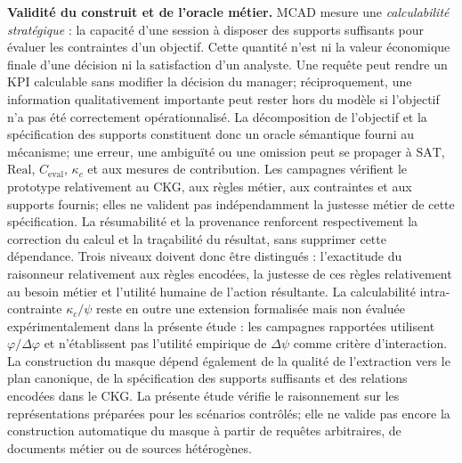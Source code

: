 \documentclass[journal]{IEEEtran}
\begin{document}
\textbf{Validité du construit et de l'oracle métier.} MCAD mesure une \emph{calculabilité stratégique} : la capacité d'une session à disposer des supports suffisants pour évaluer les contraintes d'un objectif. Cette quantité n'est ni la valeur économique finale d'une décision ni la satisfaction d'un analyste. Une requête peut rendre un KPI calculable sans modifier la décision du manager; réciproquement, une information qualitativement importante peut rester hors du modèle si l'objectif n'a pas été correctement opérationnalisé. La décomposition de l'objectif et la spécification des supports constituent donc un oracle sémantique fourni au mécanisme; une erreur, une ambiguïté ou une omission peut se propager à $\mathrm{SAT}$, $\mathrm{Real}$, $C_{\mathrm{eval}}$, $\kappa_c$ et aux mesures de contribution. Les campagnes vérifient le prototype relativement au CKG, aux règles métier, aux contraintes et aux supports fournis; elles ne valident pas indépendamment la justesse métier de cette spécification. La résumabilité et la provenance renforcent respectivement la correction du calcul et la traçabilité du résultat, sans supprimer cette dépendance. Trois niveaux doivent donc être distingués : l'exactitude du raisonneur relativement aux règles encodées, la justesse de ces règles relativement au besoin métier et l'utilité humaine de l'action résultante. La calculabilité intra-contrainte $\kappa_c/\psi$ reste en outre une extension formalisée mais non évaluée expérimentalement dans la présente étude : les campagnes rapportées utilisent $\varphi/\Delta\varphi$ et n'établissent pas l'utilité empirique de $\Delta\psi$ comme critère d'interaction. La construction du masque dépend également de la qualité de l'extraction vers le plan canonique, de la spécification des supports suffisants et des relations encodées dans le CKG. La présente étude vérifie le raisonnement sur les représentations préparées pour les scénarios contrôlés; elle ne valide pas encore la construction automatique du masque à partir de requêtes arbitraires, de documents métier ou de sources hétérogènes.
\end{document}
